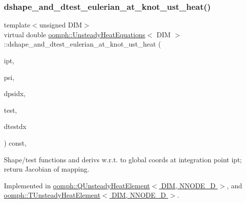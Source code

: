 \subsubsection{\texorpdfstring{dshape\+\_\+and\+\_\+dtest\+\_\+eulerian\+\_\+at\+\_\+knot\+\_\+ust\+\_\+heat()}{dshape\_and\_dtest\_eulerian\_at\_knot\_ust\_heat()}}
{\footnotesize\ttfamily template$<$unsigned D\+IM$>$ \\
virtual double \hyperlink{classoomph_1_1UnsteadyHeatEquations}{oomph\+::\+Unsteady\+Heat\+Equations}$<$ D\+IM $>$\+::dshape\+\_\+and\+\_\+dtest\+\_\+eulerian\+\_\+at\+\_\+knot\+\_\+ust\+\_\+heat (\begin{DoxyParamCaption}\item[{const unsigned \&}]{ipt,  }\item[{\hyperlink{classoomph_1_1Shape}{Shape} \&}]{psi,  }\item[{\hyperlink{classoomph_1_1DShape}{D\+Shape} \&}]{dpsidx,  }\item[{\hyperlink{classoomph_1_1Shape}{Shape} \&}]{test,  }\item[{\hyperlink{classoomph_1_1DShape}{D\+Shape} \&}]{dtestdx }\end{DoxyParamCaption}) const\hspace{0.3cm}{\ttfamily [protected]}, {}}



Shape/test functions and derivs w.\+r.\+t. to global coords at integration point ipt; return Jacobian of mapping. 



Implemented in \hyperlink{classoomph_1_1QUnsteadyHeatElement_ab9d47c020336e2c5accdca2014a5218e}{oomph\+::\+Q\+Unsteady\+Heat\+Element$<$ D\+I\+M, N\+N\+O\+D\+E\+\_\+D $>$}, and \hyperlink{classoomph_1_1TUnsteadyHeatElement_a0e7b03ebbf897295a34bae8d0dfe9686}{oomph\+::\+T\+Unsteady\+Heat\+Element$<$ D\+I\+M, N\+N\+O\+D\+E\+\_\+D $>$}.

\mbox{\label{classoomph_1_1UnsteadyHeatEquations_a70c72c1d6e716657d819264f1131b77c}} 
